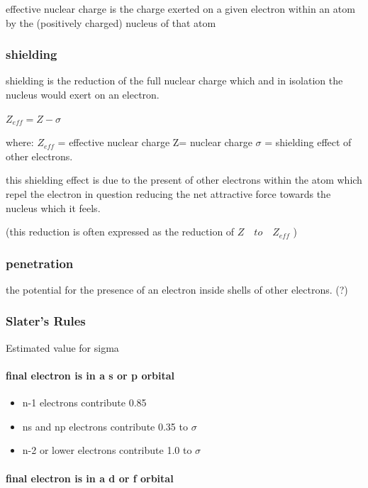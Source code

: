 \documentclass[]{article}
\providecommand{\tightlist}{%
  \setlength{\itemsep}{0pt}\setlength{\parskip}{0pt}}
\let\oldparagraph\paragraph
\renewcommand{\paragraph}[1]{\oldparagraph{#1}\mbox{}}
\begin{document}
effective nuclear charge is the charge exerted on a given electron
within an atom by the (positively charged) nucleus of that atom

\subsubsection{shielding}\label{shielding}

shielding is the reduction of the full nuclear charge which and in
isolation the nucleus would exert on an electron.

\(Z_{eff} = Z - \sigma\quad\)

where: \(Z_{eff}\) = effective nuclear charge Z= nuclear charge
\(\sigma\) = shielding effect of other electrons.

this shielding effect is due to the present of other electrons within
the atom which repel the electron in question reducing the net
attractive force towards the nucleus which it feels.

(this reduction is often expressed as the reduction of
\(Z \quad to \quad Z_{eff}\) )

\subsubsection{penetration}\label{penetration}

the potential for the presence of an electron inside shells of other
electrons. (?)

\subsubsection{Slater's Rules}\label{slaters-rules}

Estimated value for sigma

\paragraph{final electron is in a s or p
orbital}\label{final-electron-is-in-a-s-or-p-orbital}

\begin{itemize}
\tightlist
\item
  n-1 electrons contribute 0.85
\item
  ns and np electrons contribute 0.35 to \(\sigma\quad\)
\item
  n-2 or lower electrons contribute 1.0 to \(\sigma\quad\)
\end{itemize}

\paragraph{final electron is in a d or f
orbital}\label{final-electron-is-in-a-d-or-f-orbital}
\end{document}
